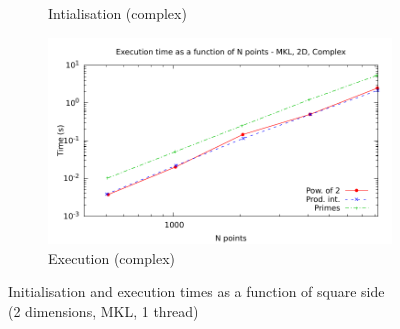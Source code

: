 \documentclass[12pt, a4paper]{article}
\begin{document}
\begin{figure}[H]
\begin{subfigure}{.5\textwidth}
\caption{Intialisation (complex)}
\label{2DMKLCI}
\end{subfigure}%
\begin{subfigure}{.5\textwidth}
\centering
\includegraphics[width=.9\linewidth]{graphs/2d-mkl-exec-c.pdf}
\caption{Execution (complex)}
\label{2DMKLC}
\end{subfigure}
\caption{Initialisation and execution times as a function of square side\\(2 dimensions, MKL, 1 thread)}
\label{2DMKL}
\end{figure}
\end{document}
